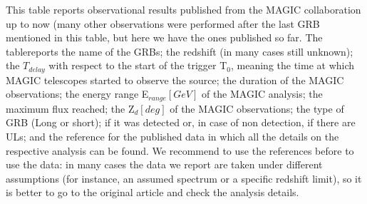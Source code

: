 
This table reports observational results published from the MAGIC collaboration up to now (many other observations were performed after the last GRB mentioned in this table, but here we have the ones published so far. The tablereports the name of the GRBs; the redshift (in many cases still unknown); the $T_{delay}$ with respect to the start of the trigger T$_{0}$, meaning the time at which MAGIC telescopes started to observe the source; the duration of the MAGIC observations; the energy range E$_{range}[GeV]$ of the MAGIC analysis; the maximum flux reached; the Z$_{d}[deg]$ of the MAGIC observations; the type of GRB (Long or short); if it was detected or, in case of non detection, if there are ULs; and the reference for the published data in which all the details on the respective analysis can be found. We recommend to use the references before to use the data: in many cases the data we report are taken under different assumptions (for instance, an assumed spectrum or a specific redshift limit), so it is better to go to the original article and check the analysis details. 
\setlength{\LTleft}{-\extralength}

\setlength{\tabcolsep}{6pt}

\small

